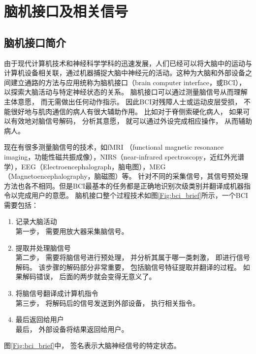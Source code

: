 ﻿\chapter{脑机接口及相关信号}

\section{脑机接口简介}

由于现代计算机技术和神经科学学科的迅速发展，人们已经可以将大脑中的运动与计算机设备相关联，通过机器捕捉大脑中神经元的活动\cite{wolpaw2002brain}。这种为大脑和外部设备之间建立通路的方法与应用统称为脑机接口（brain computer interface，或BCI）\cite{van2009brain,donoghue2002connecting}，以探索大脑活动与特定神经状态的关系。 脑机接口可以通过测量脑信号从而理解主体意愿， 而无需做出任何动作指示\cite{kostov2000parallel,allison2007brain,birbaumer2007brain}。 因此BCI对残障人士或运动皮层受损， 不能很好地与肌肉通信的病人有很大辅助作用。 比如对于脊侧索硬化\cite{allison2007brain}病人， 如果可以有效地对脑信号解码， 分析其意愿， 就可以通过外设完成相应操作， 从而辅助病人。 

现在有很多测量脑信号的技术，如fMRI （functional magnetic resonance imaging，功能性磁共振成像），NIRS（near-infrared spectroscopy，近红外光谱学），EEG（Electroencephalograph，脑电图），MEG（Magnetoencephalography，脑磁图）等。 针对不同的采集信号，其信号预处理方法也各不相同。但是BCI最基本的任务都是正确地识别次级类别并翻译成机器指令以完成用户的意愿。 脑机接口整个过程技术如图\ref{Fig:bci_brief}所示\cite{farwell1988talking}，一个BCI需要包括：

\begin{enumerate}
\item{记录大脑活动}\\
	第一步， 需要用放大器采集脑信号。 
\item{提取并处理脑信号}\\
	第二步， 需要将脑信号进行预处理， 并分析其属于哪一类刺激， 即进行信号解码。 该步骤的解码部分非常重要， 包括脑信号特征提取并翻译的过程。 如果解码错误， 后面的两步就会变得无意义了。
\item{将脑信号翻译成计算机指令}\\
	第三步， 将解码后的信号发送到外部设备， 执行相关指令。
\item{最后返回给用户}\\
	最后， 外部设备将结果返回给用户。
\end{enumerate}

图\ref{Fig:bci_brief}中， 签名表示大脑神经信号的特定状态。 

